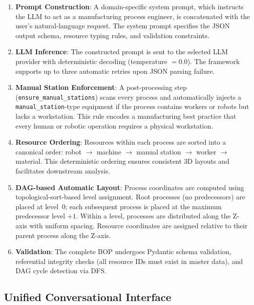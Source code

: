 \begin{enumerate}
    \item \textbf{Prompt Construction}: A domain-specific system prompt, which instructs the LLM to act as a manufacturing process engineer, is concatenated with the user's natural-language request. The system prompt specifies the JSON output schema, resource typing rules, and validation constraints.

    \item \textbf{LLM Inference}: The constructed prompt is sent to the selected LLM provider with deterministic decoding (temperature $= 0.0$). The framework supports up to three automatic retries upon JSON parsing failure.

    \item \textbf{Manual Station Enforcement}: A post-processing step (\texttt{ensure\_manual\_stations}) scans every process and automatically injects a \texttt{manual\_station}-type equipment if the process contains workers or robots but lacks a workstation. This rule encodes a manufacturing best practice that every human or robotic operation requires a physical workstation.

    \item \textbf{Resource Ordering}: Resources within each process are sorted into a canonical order: robot $\rightarrow$ machine $\rightarrow$ manual station $\rightarrow$ worker $\rightarrow$ material. This deterministic ordering ensures consistent 3D layouts and facilitates downstream analysis.

    \item \textbf{DAG-based Automatic Layout}: Process coordinates are computed using topological-sort-based level assignment. Root processes (no predecessors) are placed at level~0; each subsequent process is placed at the maximum predecessor level $+1$. Within a level, processes are distributed along the Z-axis with uniform spacing. Resource coordinates are assigned relative to their parent process along the Z-axis.

    \item \textbf{Validation}: The complete BOP undergoes Pydantic schema validation, referential integrity checks (all resource IDs must exist in master data), and DAG cycle detection via DFS.
\end{enumerate}

\subsection{Unified Conversational Interface}

